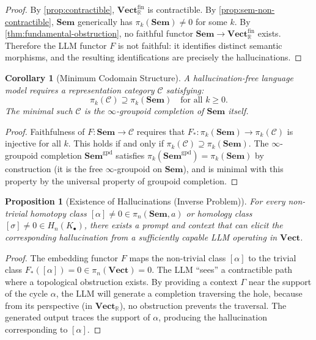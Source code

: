 \documentclass[11pt,a4paper]{article}
\theoremstyle{plain}
\newtheorem{proposition}[theorem]{Proposition}
\newtheorem{corollary}[theorem]{Corollary}
\theoremstyle{definition}
\theoremstyle{remark}
\newcommand{\Sem}{\mathbf{Sem}}
\newcommand{\Vect}{\mathbf{Vect}}
\newcommand{\R}{\mathbb{R}}
\begin{document}
\begin{proof}
By \cref{prop:contractible}, $\Vect_{\R}^{\mathrm{fin}}$ is contractible. By \cref{prop:sem-non-contractible}, $\Sem$ generically has $\pi_k(\Sem) \neq 0$ for some $k$. By \cref{thm:fundamental-obstruction}, no faithful functor $\Sem \to \Vect_{\R}^{\mathrm{fin}}$ exists. Therefore the LLM functor $F$ is not faithful: it identifies distinct semantic morphisms, and the resulting identifications are precisely the hallucinations.
\end{proof}

\begin{corollary}[Minimum Codomain Structure]
\label{cor:minimum-codomain}
A hallucination-free language model requires a representation category $\mathcal{C}$ satisfying:
\begin{equation}
\pi_k(\mathcal{C}) \supseteq \pi_k(\Sem) \quad \text{for all } k \geq 0.
\end{equation}
The minimal such $\mathcal{C}$ is the $\infty$-groupoid completion of $\Sem$ itself.
\end{corollary}

\begin{proof}
Faithfulness of $F: \Sem \to \mathcal{C}$ requires that $F_*: \pi_k(\Sem) \to \pi_k(\mathcal{C})$ is injective for all $k$. This holds if and only if $\pi_k(\mathcal{C}) \supseteq \pi_k(\Sem)$. The $\infty$-groupoid completion $\Sem^{\mathrm{gpd}}$ satisfies $\pi_k(\Sem^{\mathrm{gpd}}) = \pi_k(\Sem)$ by construction (it is the free $\infty$-groupoid on $\Sem$), and is minimal with this property by the universal property of groupoid completion.
\end{proof}

\begin{proposition}[Existence of Hallucinations (Inverse Problem)]
\label{prop:inverse}
For every non-trivial homotopy class $[\alpha] \neq 0 \in \pi_n(\Sem, a)$ or homology class $[\sigma] \neq 0 \in H_n(K_\bullet)$, there exists a prompt and context that can elicit the corresponding hallucination from a sufficiently capable LLM operating in $\Vect$.
\end{proposition}

\begin{proof}
The embedding functor $F$ maps the non-trivial class $[\alpha]$ to the trivial class $F_*([\alpha]) = 0 \in \pi_n(\Vect) = 0$. The LLM ``sees'' a contractible path where a topological obstruction exists. By providing a context $\Gamma$ near the support of the cycle $\alpha$, the LLM will generate a completion traversing the hole, because from its perspective (in $\Vect_{\R}$), no obstruction prevents the traversal. The generated output traces the support of $\alpha$, producing the hallucination corresponding to $[\alpha]$.
\end{proof}
\end{document}
